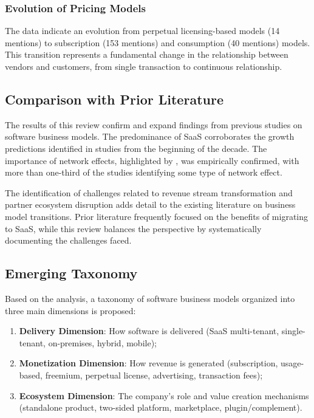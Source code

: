 \documentclass[journal]{IEEEtran}
\begin{document}
\subsubsection{Evolution of Pricing Models}

The data indicate an evolution from perpetual licensing-based models (14 mentions) to subscription (153 mentions) and consumption (40 mentions) models. This transition represents a fundamental change in the relationship between vendors and customers, from single transaction to continuous relationship.

\subsection{Comparison with Prior Literature}

The results of this review confirm and expand findings from previous studies on software business models. The predominance of SaaS corroborates the growth predictions identified in studies from the beginning of the decade. The importance of network effects, highlighted by \cite{keele2007guidelines}, was empirically confirmed, with more than one-third of the studies identifying some type of network effect.

The identification of challenges related to revenue stream transformation and partner ecosystem disruption adds detail to the existing literature on business model transitions. Prior literature frequently focused on the benefits of migrating to SaaS, while this review balances the perspective by systematically documenting the challenges faced.

\subsection{Emerging Taxonomy}

Based on the analysis, a taxonomy of software business models organized into three main dimensions is proposed:

\begin{enumerate}
    \item \textbf{Delivery Dimension}: How software is delivered (SaaS multi-tenant, single-tenant, on-premises, hybrid, mobile);

    \item \textbf{Monetization Dimension}: How revenue is generated (subscription, usage-based, freemium, perpetual license, advertising, transaction fees);

    \item \textbf{Ecosystem Dimension}: The company's role and value creation mechanisms (standalone product, two-sided platform, marketplace, plugin/complement).
\end{enumerate}
\end{document}
